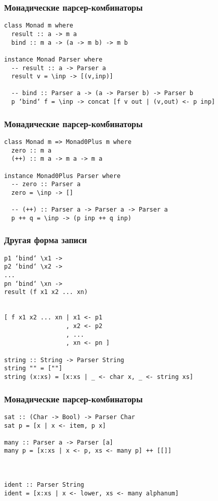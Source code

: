 \documentclass{beamer}
\begin{document}
\begin{frame}[fragile]
  \transwipe[direction=90]
  \frametitle{Монадические парсер-комбинаторы}
\begin{verbatim}
class Monad m where
  result :: a -> m a
  bind :: m a -> (a -> m b) -> m b

instance Monad Parser where
  -- result :: a -> Parser a
  result v = \inp -> [(v,inp)]

  -- bind :: Parser a -> (a -> Parser b) -> Parser b
  p ‘bind‘ f = \inp -> concat [f v out | (v,out) <- p inp]
\end{verbatim}
\end{frame}

\begin{frame}[fragile]
  \transwipe[direction=90]
  \frametitle{Монадические парсер-комбинаторы}
\begin{verbatim}
class Monad m => Monad0Plus m where
  zero :: m a
  (++) :: m a -> m a -> m a

instance Monad0Plus Parser where
  -- zero :: Parser a
  zero = \inp -> []
  
  -- (++) :: Parser a -> Parser a -> Parser a
  p ++ q = \inp -> (p inp ++ q inp)
\end{verbatim}
\end{frame}

\begin{frame}[fragile]
  \transwipe[direction=90]
  \frametitle{Другая форма записи}
\begin{verbatim}
p1 ‘bind‘ \x1 ->
p2 ‘bind‘ \x2 ->
...
pn ‘bind‘ \xn ->
result (f x1 x2 ... xn)


[ f x1 x2 ... xn | x1 <- p1
                 , x2 <- p2
                 , ...
                 , xn <- pn ]

string :: String -> Parser String
string "" = [""]
string (x:xs) = [x:xs | _ <- char x, _ <- string xs]
\end{verbatim}
\end{frame}

\begin{frame}[fragile]
  \transwipe[direction=90]
  \frametitle{Монадические парсер-комбинаторы}
\begin{verbatim}
sat :: (Char -> Bool) -> Parser Char
sat p = [x | x <- item, p x]

many :: Parser a -> Parser [a]
many p = [x:xs | x <- p, xs <- many p] ++ [[]]



ident :: Parser String
ident = [x:xs | x <- lower, xs <- many alphanum]
\end{verbatim}
\end{frame}
\end{document}
